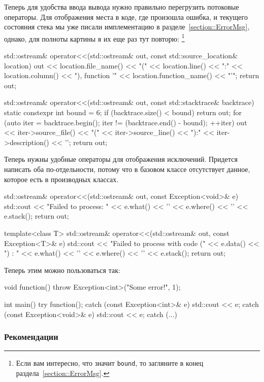 Теперь для удобства ввода вывода нужно правильно перегрузить потоковые операторы.
Для отображения места в коде, где произошла ошибка, и текущего состояния стека мы уже писали имплементацию в разделе~\ref{section::ErrorMsg}, однако, для полноты картины я их еще раз тут повторю:%
\footnote{Если вам интересно, что значит \verb"bound", то загляните в конец раздела~\ref{section::ErrorMsg}.}
\begin{cppcode}
std::ostream& operator<<(std::ostream& out, const std::source_location& location) {
  out << location.file_name() << "(" << location.line() << ":"
      << location.column() << "), function '" << location.function_name()
      << "'";
  return out;
}

std::ostream& operator<<(std::ostream& out, const std::stacktrace& backtrace) {
  static constexpr int bound = 6;
  if (backtrace.size() < bound)
    return out;
  for (auto iter = backtrace.begin(); iter != (backtrace.end() - bound); ++iter) {
    out << iter->source_file() << "(" << iter->source_line()
        << "):" << iter->description() << '\n';
  }
  return out;
}
\end{cppcode}
Теперь нужны удобные операторы для отображения исключений.
Придется написать оба по-отдельности, потому что в базовом классе отсутствует данное, которое есть в производных классах.
\begin{cppcode}
std::ostream& operator<<(std::ostream& out, const Exception<void>& e) {
  std::cout << "Failed to process: " << e.what() << '\n'
            << e.where() << '\n'
            << e.stack();
  return out;
}

template<class T>
std::ostream& operator<<(std::ostream& out, const Exception<T>& e) {
  std::cout << "Failed to process with code (" << e.data() << ") : " << e.what()
            << '\n'
            << e.where() << '\n'
            << e.stack();
  return out;
}
\end{cppcode}
Теперь этим можно пользоваться так:
\begin{cppcode}
void function() {
  throw Exception<int>("Some error!", 1);
}

int main() {
  try {
    function();
  } catch (const Exception<int>& e) {
    std::cout << e;
  } catch (const Exception<void>& e) {
    std::cout << e;
  } catch (...) {
  }
}
\end{cppcode}

\subsubsection{Рекомендации}

